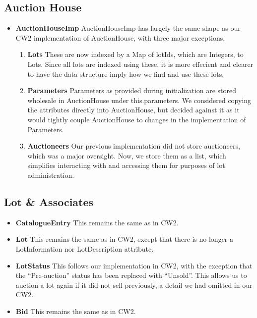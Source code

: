 \documentclass[titlepage, 12pt]{extarticle}
\begin{document}
\subsection{Auction House}
\begin{itemize}
    \item {\bf AuctionHouseImp} AuctionHouseImp has largely the same shape as
        our CW2 implementation of AuctionHouse, with three major exceptions.
        \begin{enumerate}
            \item {\bf Lots} These are now indexed by a Map of lotIds, which are
                Integers, to Lots. Since all lots are indexed using these, it is
                more effecient and clearer to have the data structure imply how
                we find and use these lots.
            \item {\bf Parameters} Parameters as provided during initialization
                are stored wholesale in AuctionHouse under this.parameters. We
                considered copying the attributes directly into AuctionHouse,
                but decided against it as it would tightly couple AuctionHouse
                to changes in the implementation of Parameters.
            \item {\bf Auctioneers} Our previous implementation did not store
                auctioneers, which was a major oversight. Now, we store them as
                a list, which simplifies interacting with and accessing them for
                purposes of lot administration.
        \end{enumerate}
\end{itemize}
\subsection{Lot & Associates}
\begin{itemize}
    \item {\bf CatalogueEntry} This remains the same as in CW2.
    \item {\bf Lot} This remains the same as in CW2, except that there is no
        longer a LotInformation nor LotDescription attribute. 
    \item {\bf LotStatus} This follows our implementation in CW2, with the
        exception that the ``Pre-auction'' status has been replaced with
        ``Unsold''. This allows us to auction a lot again if it did not sell
        previously, a detail we had omitted in our CW2. 
    \item {\bf Bid} This remains the same as in CW2.
\end{itemize}
\end{document}
